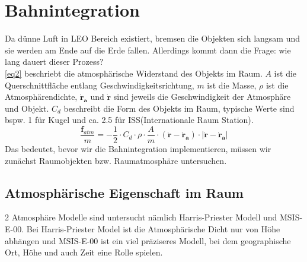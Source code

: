 \documentclass{article}
\begin{document}
\section{Bahnintegration}
Da dünne Luft in LEO Bereich existiert, bremsen die Objekten sich langsam und sie werden am Ende auf die Erde fallen. Allerdings kommt dann die Frage: wie lang dauert dieser Prozess?
\\
\autoref{eq2} beschriebt die atmosphärische Widerstand des Objekts im Raum. $A$ ist die Querschnittfläche entlang Geschwindigkeitsrichtung, $m$ ist die Masse, $\rho$ ist die Atmosphärendichte, $\bm{\dot{r}_a}$ und $\bm{\dot{r}}$ sind jeweils die Geschwindigkeit der Atmosphäre und Objekt. $C_d$ beschreibt die Form des Objekts im Raum, typische Werte sind bspw. 1 für Kugel und ca. 2.5 für ISS(Internationale Raum Station).
\begin{equation}\label{eq2}
	\frac{\bm{f}_{atm}}{m} = -\frac{1}{2} \cdot C_d \cdot \rho \cdot \frac{A}{m} \cdot \left(\bm{\dot{r}} - \bm{\dot{r}_a}\right) \cdot |\bm{\dot{r}} - \bm{\dot{r}_a}|
\end{equation}
Das bedeutet, bevor wir die Bahnintegration implementieren, müssen wir zunächst Raumobjekten bzw. Raumatmosphäre untersuchen.
\subsection{Atmosphärische Eigenschaft im Raum}
2 Atmosphäre Modelle sind untersucht nämlich Harris-Priester Modell und MSIS-E-00. Bei Harris-Priester Model ist die Atmosphärische Dicht nur von Höhe abhängen und MSIS-E-00 ist ein viel präziseres Modell, bei dem geographische Ort, Höhe und auch Zeit eine Rolle spielen.
\\
\end{document}
